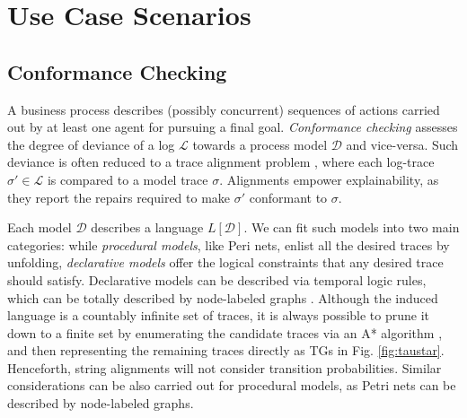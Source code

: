 \section{Use Case Scenarios}
\subsection{Conformance Checking}
A business process describes (possibly concurrent) sequences of actions carried out by at least one agent for pursuing a final goal. %
\textit{Conformance checking} assesses the degree of deviance of a log $\mathcal{L}$ towards a process model $\mathcal{D}$ and vice-versa. Such deviance is often reduced to a trace alignment problem \cite{DBLP:conf/edoc/AdriansyahDA11}, where each log-trace $\sigma'\in\mathcal{L}$ is compared to a model trace $\sigma$. Alignments empower explainability, as they report the repairs required to make $\sigma'$ conformant to $\sigma$.%

Each model $\mathcal{D}$ describes a language $L[\mathcal{D}]$. We can fit such models into two main categories: while \textit{procedural models}, like Peri nets, enlist all the desired traces by unfolding, \textit{declarative models} offer the logical constraints that any desired trace should satisfy. Declarative models can be described via temporal logic rules, which can be totally described by node-labeled graphs \cite{GiacomoMM14}. Although the induced language is a countably infinite set of traces, it is always possible to prune it down to a finite set  by enumerating the candidate traces via an A* algorithm \cite{LeoniMA12}, and then representing the remaining traces directly as TGs in Fig. \ref{fig:taustar}. Henceforth, string alignments will not consider transition probabilities. Similar considerations can be also carried out for procedural models, as Petri nets can be described by node-labeled graphs. %




